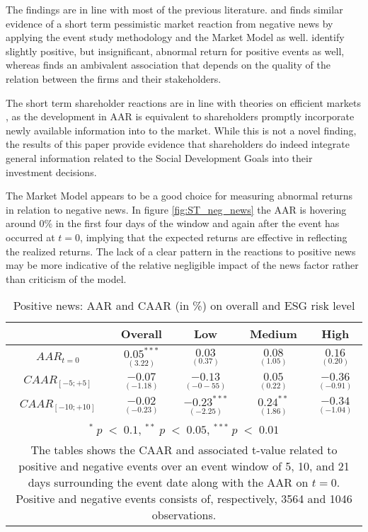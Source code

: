 The findings are in line with most of the previous literature. \cite{Blancard_ESG_sentiment} and \citep{kruger2015corporate} finds similar evidence of a short term pessimistic market reaction from negative news by applying the event study methodology and the Market Model as well. \citeauthor{Blancard_ESG_sentiment} identify slightly positive, but insignificant, abnormal return for positive events as well, whereas \citeauthor{kruger2015corporate} finds an ambivalent association that depends on the quality of the relation between the firms and their stakeholders. 

The short term shareholder reactions are in line with theories on efficient markets \citep{fama1969_EMH}, as the development in AAR is equivalent to shareholders promptly incorporate newly available information into to the market. While this is not a novel finding, the results of this paper provide evidence that shareholders do indeed integrate general information related to the Social Development Goals into their investment decisions. 

The Market Model appears to be a good choice for measuring abnormal returns in relation to negative news. In figure \ref{fig:ST_neg_news} the AAR is hovering around 0\% in the first four days of the window and again after the event has occurred at $t = 0$, implying that the expected returns are effective in reflecting the realized returns. The lack of a clear pattern in the reactions to positive news may be more indicative of the relative negligible impact of the news factor rather than criticism of the model.    

\begin{table}[H]
\centering
\caption{Positive news: AAR and CAAR (in \%) on overall and ESG risk level} 
\begin{tabular}{ccccc}
  \hline  \hline
  & \multicolumn{1}{c}{Overall} &  \multicolumn{1}{c}{Low} & \multicolumn{1}{c}{Medium} & \multicolumn{1}{c}{High}\\  
 \hline
$AAR_{t=0}$ &  $\underset{(3.22)}{0.05^{***}}$ & $\underset{(0.37)}{0.03}$ & $\underset{(1.05)}{0.08}$ &  $\underset{(0.20)}{0.16}$ \\ 
$CAAR_{[-5;+5]}$  & $\underset{(-1.18)}{-0.07}$ &  $\underset{(-0-55)}{-0.13 }$ &  $\underset{(0.22)}{0.05 }$ &  $\underset{(-0.91)}{-0.36}$ \\ 
$CAAR_{[-10;+10]}$    & $\underset{(-0.23)}{-0.02}$ &  $\underset{(-2.25)}{-0.23^{***}}$ &  $\underset{(1.86)}{0.24^{**}}$ &  $\underset{(-1.04)}{-0.34}$ \\ 
    \hline \hline
   \multicolumn{5}{p{12.5cm}}{ \footnotesize $^* \; p\; <\; 0.1$, $ ^{**} \; p\; <\; 0.05$, $ ^{***} \; p\; <\; 0.01$  } \\
   \multicolumn{5}{p{13cm}}{\footnotesize The tables shows the CAAR and associated t-value related to positive and negative events over an event window of 5, 10, and 21 days surrounding the event date along with the AAR on $t=0$. Positive and negative events consists of, respectively, 3564 and 1046 observations. } \\
   \hline
\end{tabular}
\label{tab: ST_pos_significance}
\end{table}

